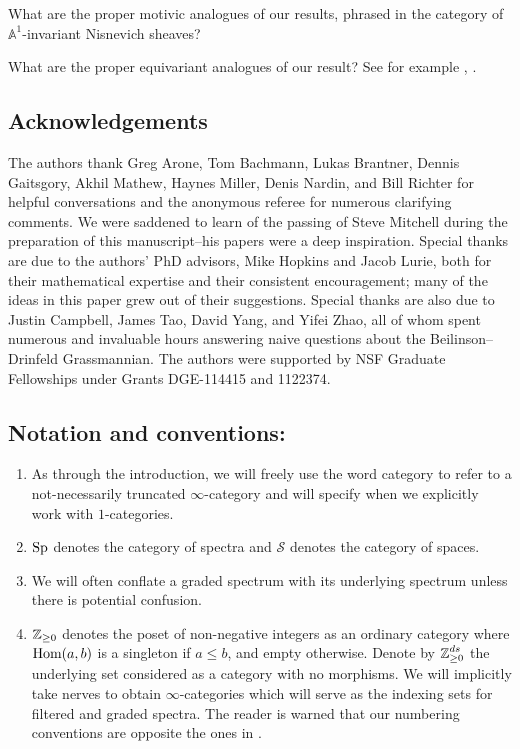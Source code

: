 \begin{qst}
What are the proper motivic analogues of our results, phrased in the category of $\mathbb{A}^1$-invariant Nisnevich sheaves? 
\end{qst}

\begin{qst}
What are the proper equivariant analogues of our result?  See for example \cite{Ullman}, \cite{Tynan}.
\end{qst}

\subsection*{Acknowledgements}
The authors thank Greg Arone, Tom Bachmann, Lukas Brantner, Dennis Gaitsgory, Akhil Mathew, Haynes Miller, Denis Nardin, and Bill Richter for helpful conversations and the anonymous referee for numerous clarifying comments.  We were saddened to learn of the passing of Steve Mitchell during the preparation of this manuscript--his papers were a deep inspiration.  Special thanks are due to the authors' PhD advisors, Mike Hopkins and Jacob Lurie, both for their mathematical expertise and their consistent encouragement; many of the ideas in this paper grew out of their suggestions.  Special thanks are also due to Justin Campbell, James Tao, David Yang, and Yifei Zhao, all of whom spent numerous and invaluable hours answering naive questions about the Beilinson--Drinfeld Grassmannian.  The authors were supported by NSF Graduate Fellowships under Grants DGE-114415 and 1122374.

\subsection*{Notation and conventions:} 
\begin{enumerate}
\item As through the introduction, we will freely use the word category to refer to a not-necessarily truncated $\infty$-category and will specify when we explicitly work with $1$-categories.  
\item $\operatorname{\mathrm{Sp}}$ denotes the category of spectra and $\mathcal{S}$ denotes the category of spaces.  
\item We will often conflate a graded spectrum with its underlying spectrum unless there is potential confusion.  
\item $\operatorname{\mathbb{Z}}_{\geq 0}$ denotes the poset of non-negative integers as an ordinary category where $\operatorname{\text{Hom}}(a,b)$ is a singleton if $a\leq b$, and empty otherwise.  Denote by $\operatorname{\mathbb{Z}}_{\geq 0}^{ds}$ the underlying set considered as a category with no morphisms.  We will implicitly take nerves to obtain $\infty$-categories which will serve as the indexing sets for filtered and graded spectra.  The reader is warned that our numbering conventions are opposite the ones in \cite{LurieRot}.
\end{enumerate}